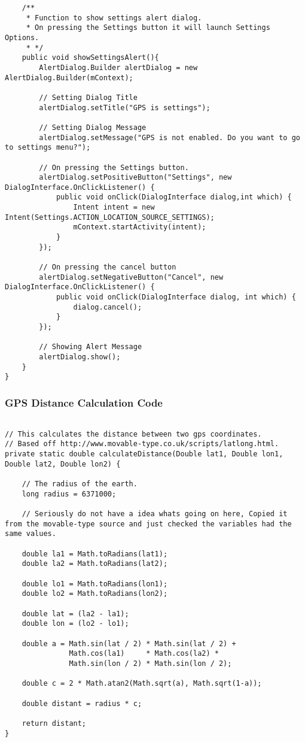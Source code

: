 \begin{lstlisting}
    /**
     * Function to show settings alert dialog.
     * On pressing the Settings button it will launch Settings Options.
     * */
    public void showSettingsAlert(){
        AlertDialog.Builder alertDialog = new AlertDialog.Builder(mContext);

        // Setting Dialog Title
        alertDialog.setTitle("GPS is settings");

        // Setting Dialog Message
        alertDialog.setMessage("GPS is not enabled. Do you want to go to settings menu?");

        // On pressing the Settings button.
        alertDialog.setPositiveButton("Settings", new DialogInterface.OnClickListener() {
            public void onClick(DialogInterface dialog,int which) {
                Intent intent = new Intent(Settings.ACTION_LOCATION_SOURCE_SETTINGS);
                mContext.startActivity(intent);
            }
        });

        // On pressing the cancel button
        alertDialog.setNegativeButton("Cancel", new DialogInterface.OnClickListener() {
            public void onClick(DialogInterface dialog, int which) {
                dialog.cancel();
            }
        });

        // Showing Alert Message
        alertDialog.show();
    }
}

\end{lstlisting}


\subsubsection*{GPS Distance Calculation Code}

\begin{lstlisting}

// This calculates the distance between two gps coordinates.
// Based off http://www.movable-type.co.uk/scripts/latlong.html.
private static double calculateDistance(Double lat1, Double lon1, Double lat2, Double lon2) {

    // The radius of the earth.
    long radius = 6371000;

    // Seriously do not have a idea whats going on here, Copied it from the movable-type source and just checked the variables had the same values.

    double la1 = Math.toRadians(lat1);
    double la2 = Math.toRadians(lat2);

    double lo1 = Math.toRadians(lon1);
    double lo2 = Math.toRadians(lon2);

    double lat = (la2 - la1);
    double lon = (lo2 - lo1);

    double a = Math.sin(lat / 2) * Math.sin(lat / 2) +
               Math.cos(la1)     * Math.cos(la2) *
               Math.sin(lon / 2) * Math.sin(lon / 2);

    double c = 2 * Math.atan2(Math.sqrt(a), Math.sqrt(1-a));

    double distant = radius * c;

    return distant;
}
 
\end{lstlisting}


